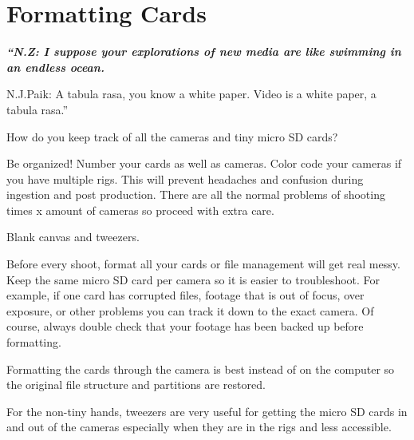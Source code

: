 \chapter{Formatting Cards}
\pagecolor{white}
\label{chap:4}
\begin{fullwidth}


{\itshape\bfseries “N.Z: I suppose your explorations of new media are like swimming in an endless ocean. 

N.J.Paik: A tabula rasa, you know a white paper. Video is a white paper, a tabula rasa.”}

\vspace{\baselineskip}

\problem

{\large How do you keep track of all the cameras and tiny micro SD cards? \par}

Be organized! Number your cards as well as cameras. Color code your cameras if you have multiple rigs. This will prevent headaches and confusion during ingestion and post production. There are all the normal problems of shooting times x amount of cameras so proceed with extra care. 


\solution

{\large Blank canvas and tweezers.
 \par}

Before every shoot, format all your cards or file management will get real messy. Keep the same micro SD card per camera so it is easier to troubleshoot. For example, if one card has corrupted files, footage that is out of focus, over exposure, or other problems you can track it down to the exact camera. Of course, always double check that your footage has been backed up before formatting. 

Formatting the cards through the camera is best instead of on the computer so the original file structure and partitions are restored. 

\tip For the non-tiny hands, tweezers are very useful for getting the micro SD cards in and out of the cameras especially when they are in the rigs and less accessible. 



\clearpage
\end{fullwidth}
